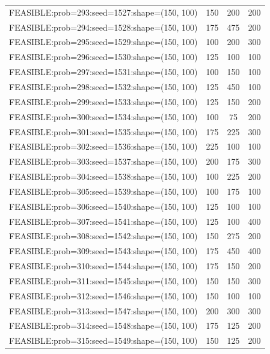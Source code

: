 \begin{longtable}{lccc}
FEASIBLE:prob=293:seed=1527:shape=(150, 100) &      150 &   200 &    200 \\
FEASIBLE:prob=294:seed=1528:shape=(150, 100) &      175 &   475 &    200 \\
FEASIBLE:prob=295:seed=1529:shape=(150, 100) &      100 &   200 &    300 \\
FEASIBLE:prob=296:seed=1530:shape=(150, 100) &      125 &   100 &    100 \\
FEASIBLE:prob=297:seed=1531:shape=(150, 100) &      100 &   150 &    100 \\
FEASIBLE:prob=298:seed=1532:shape=(150, 100) &      125 &   450 &    100 \\
FEASIBLE:prob=299:seed=1533:shape=(150, 100) &      125 &   150 &    200 \\
FEASIBLE:prob=300:seed=1534:shape=(150, 100) &      100 &    75 &    200 \\
FEASIBLE:prob=301:seed=1535:shape=(150, 100) &      175 &   225 &    300 \\
FEASIBLE:prob=302:seed=1536:shape=(150, 100) &      225 &   100 &    100 \\
FEASIBLE:prob=303:seed=1537:shape=(150, 100) &      200 &   175 &    300 \\
FEASIBLE:prob=304:seed=1538:shape=(150, 100) &      100 &   225 &    200 \\
FEASIBLE:prob=305:seed=1539:shape=(150, 100) &      100 &   175 &    100 \\
FEASIBLE:prob=306:seed=1540:shape=(150, 100) &      125 &   100 &    100 \\
FEASIBLE:prob=307:seed=1541:shape=(150, 100) &      125 &   100 &    400 \\
FEASIBLE:prob=308:seed=1542:shape=(150, 100) &      150 &   275 &    200 \\
FEASIBLE:prob=309:seed=1543:shape=(150, 100) &      175 &   450 &    400 \\
FEASIBLE:prob=310:seed=1544:shape=(150, 100) &      175 &   150 &    200 \\
FEASIBLE:prob=311:seed=1545:shape=(150, 100) &      150 &   150 &    300 \\
FEASIBLE:prob=312:seed=1546:shape=(150, 100) &      150 &   100 &    100 \\
FEASIBLE:prob=313:seed=1547:shape=(150, 100) &      200 &   300 &    300 \\
FEASIBLE:prob=314:seed=1548:shape=(150, 100) &      175 &   125 &    200 \\
FEASIBLE:prob=315:seed=1549:shape=(150, 100) &      150 &   125 &    200 \\

\end{longtable}
